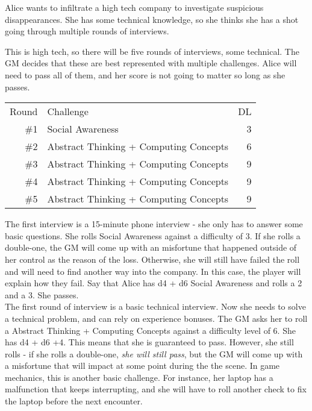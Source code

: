 \documentclass{LegrandOrangeTufteBook}
\newcommand{\termCore}[1]{\textcolor{colorCoreCompetency}{#1}}
\newcommand{\term}[1]{\textcolor{colorTerm}{#1}}
\begin{document}
Alice wants to infiltrate a high tech company to investigate suspicious disappearances. She has some technical knowledge, so she thinks she has a shot going through multiple rounds of interviews.\\


This is high tech, so there will be five rounds of interviews, some technical. The GM decides that these are best represented with multiple \term{challenges}. Alice will need to pass all of them, and her \term{score} is not going to matter so long as she passes.\\

\begin{tabularx}{\columnwidth}{rXr}
	Round	& Challenge 								& DL\\
	\#1 	& \termCore{Social Awareness}					& 3 \\
	\#2 	& \termCore{Abstract Thinking} + Computing Concepts	& 6 \\
	\#3 	& \termCore{Abstract Thinking} + Computing Concepts	& 9 \\
	\#4 	& \termCore{Abstract Thinking} + Computing Concepts	& 9 \\
	\#5 	& \termCore{Abstract Thinking} + Computing Concepts 	& 9 \\
\end{tabularx}

\marginpar{
	\termCore{Social Awareness} is one of the nine \term{Core Competencies}. Here is the full list:
	\footnotesize
	
}
The first interview is a 15-minute phone interview - she only has to answer some basic questions. She rolls \termCore{Social Awareness} against a difficulty of 3. If she rolls a double-one, the GM will come up with an \term{misfortune} that happened outside of her control as the reason of the loss. Otherwise, she will still have failed the roll and will need to find another way into the company. In this case, the player will explain how they fail. Say that Alice has d4 + d6 \termCore{Social Awareness} and rolls a 2 and a 3. She passes.  \\

The first round of interview is a basic technical interview. Now she needs to solve a technical problem, and can rely on experience bonuses. The GM asks her to roll a \termCore{Abstract Thinking} + Computing Concepts against a \term{difficulty level} of 6. She has d4 + d6 +4. This means that she is guaranteed to pass. However, she still rolls - if she rolls a double-one, \emph{she will still pass}, but the GM will come up with a \termCore{misfortune} that will impact at some point during the the scene. In game mechanics, this is another basic \term{challenge}. For instance, her laptop has a malfunction that keeps interrupting, and she will have to roll another check to fix the laptop before the next encounter. \\
\end{document}
